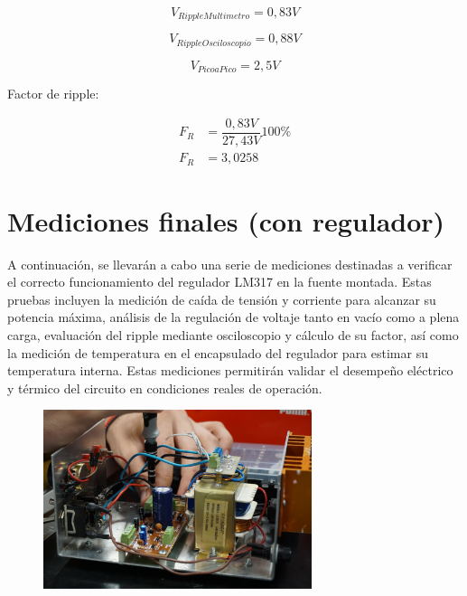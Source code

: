 \begin{equation}
  V_{RippleMultimetro} = 0,83 V
\end{equation}

\begin{equation}
  V_{RippleOsciloscopio} = 0,88 V
\end{equation}

\begin{equation}
  V_{PicoaPico} = 2,5 V
\end{equation}

Factor de ripple:

\begin{equation}
  \begin{aligned}
    F_R &= \dfrac{0,83 V}{27,43 V} 100\percent\\
    F_R &= 3,0258
  \end{aligned}
\end{equation}


\section{Mediciones finales (con regulador)}

A continuación, se llevarán a cabo una serie de mediciones destinadas a verificar el correcto funcionamiento del regulador LM317 en la
fuente montada. Estas pruebas incluyen la medición de caída de tensión y corriente para alcanzar su potencia máxima, análisis de la
regulación de voltaje tanto en vacío como a plena carga, evaluación del ripple mediante osciloscopio y cálculo de su factor, así como la
medición de temperatura en el encapsulado del regulador para estimar su temperatura interna. Estas mediciones permitirán validar el
desempeño eléctrico y térmico del circuito en condiciones reales de operación.

\begin{figure}[h]
  \centering
  \includegraphics[width=0.70\textwidth]{images/placaMontada.png}
\end{figure}

